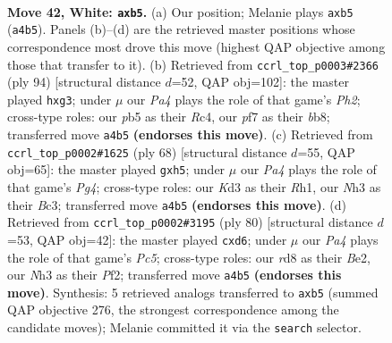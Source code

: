 \documentclass[11pt]{article}
\begin{document}
\clearpage

\begin{figure}[p]\centering
\begin{subfigure}{0.46\textwidth}\centering
\resizebox{\linewidth}{!}{%
\newchessgame
\chessboard[
  setfen={3r2k1/3b1p1p/6r1/pp6/P2p2P1/1P1K1B1N/6RP/2R5 w - - 0 42},
  showmover=false,
  pgfstyle=straightmove, color=movearrow, markmove={a4-b5}
]}
\caption{}
\end{subfigure}\hfill
\begin{subfigure}{0.46\textwidth}\centering
\resizebox{\linewidth}{!}{%
\newchessgame
\chessboard[
  setfen={1b1r4/8/3r2k1/5p2/PpRPp3/1B2K1p1/1P5P/3R4 w - - 0 48},
  showmover=false,
  pgfstyle=straightmove, color=movearrow, markmove={h2-g3}
]}
\caption{}
\end{subfigure}
\\[4pt]
\begin{subfigure}{0.46\textwidth}\centering
\resizebox{\linewidth}{!}{%
\newchessgame
\chessboard[
  setfen={4rn2/1p1r1k2/p1pP1p2/7p/5PPp/1PB5/P2R1K2/7R w - - 0 35},
  showmover=false,
  pgfstyle=straightmove, color=movearrow, markmove={g4-h5}
]}
\caption{}
\end{subfigure}\hfill
\begin{subfigure}{0.46\textwidth}\centering
\resizebox{\linewidth}{!}{%
\newchessgame
\chessboard[
  setfen={1r4k1/1bb2pp1/3p3p/1RP1p3/4P3/4P1BP/4BP2/6K1 w - - 1 41},
  showmover=false,
  pgfstyle=straightmove, color=movearrow, markmove={c5-d6}
]}
\caption{}
\end{subfigure}
\caption{\textbf{Move 42, White: \texttt{axb5}.} (a) Our position; Melanie plays \texttt{axb5} (\texttt{a4b5}). Panels (b)--(d) are the retrieved master positions whose correspondence most drove this move (highest QAP objective among those that transfer to it). (b) Retrieved from \texttt{ccrl\_top\_p0003\#2366} (ply 94) [structural distance $d$=52, QAP obj=102]: the master played \texttt{hxg3}; under $\mu$ our \emph{Pa4} plays the role of that game's \emph{Ph2}; cross-type roles: our \emph{p}b5 as their \emph{R}c4, our \emph{p}f7 as their \emph{b}b8; transferred move \texttt{a4b5} \textbf{(endorses this move)}. (c) Retrieved from \texttt{ccrl\_top\_p0002\#1625} (ply 68) [structural distance $d$=55, QAP obj=65]: the master played \texttt{gxh5}; under $\mu$ our \emph{Pa4} plays the role of that game's \emph{Pg4}; cross-type roles: our \emph{K}d3 as their \emph{R}h1, our \emph{N}h3 as their \emph{B}c3; transferred move \texttt{a4b5} \textbf{(endorses this move)}. (d) Retrieved from \texttt{ccrl\_top\_p0002\#3195} (ply 80) [structural distance $d$=53, QAP obj=42]: the master played \texttt{cxd6}; under $\mu$ our \emph{Pa4} plays the role of that game's \emph{Pc5}; cross-type roles: our \emph{r}d8 as their \emph{B}e2, our \emph{N}h3 as their \emph{P}f2; transferred move \texttt{a4b5} \textbf{(endorses this move)}. Synthesis: 5 retrieved analogs transferred to \texttt{axb5} (summed QAP objective 276, the strongest correspondence among the candidate moves); Melanie committed it via the \texttt{search} selector.}
\label{fig:thought-m82}
\end{figure}
\end{document}
